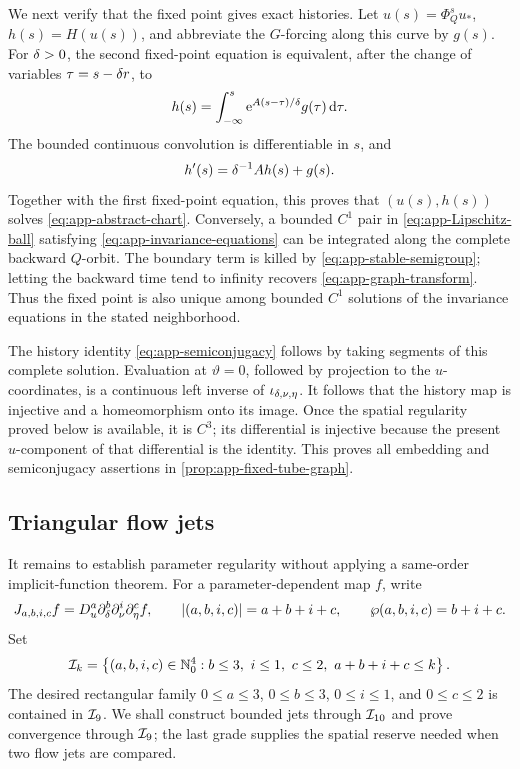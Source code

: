 We next verify that the fixed point gives exact histories.  Let
\(u(s)=\Phi_Q^s u_*\), \(h(s)=H(u(s))\), and abbreviate the \(G\)-forcing
along this curve by \(g(s)\).  For \(\delta>0\), the second fixed-point
equation is equivalent, after the change of variables
\(\tau=s-\delta r\), to
\begin{equation}
\label{eq:app-stable-convolution}
 h(s)=\int_{-\infty}^s
       \mathrm e^{A(s-\tau)/\delta}g(\tau)\,\mathrm d\tau.
\end{equation}
The bounded continuous convolution is differentiable in \(s\), and
\[
 h'(s)=\delta^{-1}Ah(s)+g(s).
\]
Together with the first fixed-point equation, this proves that
\((u(s),h(s))\) solves \cref{eq:app-abstract-chart}.  Conversely, a bounded
\(C^1\) pair in \cref{eq:app-Lipschitz-ball} satisfying
\cref{eq:app-invariance-equations} can be integrated along the complete
backward \(Q\)-orbit.  The boundary term is killed by
\cref{eq:app-stable-semigroup}; letting the backward time tend to infinity
recovers \cref{eq:app-graph-transform}.  Thus the fixed point is also unique
among bounded \(C^1\) solutions of the invariance equations in the stated
neighborhood.

The history identity \cref{eq:app-semiconjugacy} follows by taking segments
of this complete solution.  Evaluation at \(\vartheta=0\), followed by
projection to the \(u\)-coordinates, is a continuous left inverse of
\(\iota_{\delta,\nu,\eta}\).  It follows that the history map is injective and
a homeomorphism onto its image.  Once the spatial regularity proved below
is available, it is \(C^3\); its differential is injective because the
present \(u\)-component of that differential is the identity.  This proves
all embedding and semiconjugacy assertions in
\cref{prop:app-fixed-tube-graph}.

\subsection{Triangular flow jets}
\label{app:compact-flow-jets}
\label{app:mixed-jets}

It remains to establish parameter regularity without applying a same-order
implicit-function theorem.  For a parameter-dependent map \(f\), write
\begin{equation}
\label{eq:app-jet-notation}
 J_{a,b,i,c}f=D_u^a\partial_\delta^b\partial_\nu^i\partial_\eta^c f,
 \qquad
 |(a,b,i,c)|=a+b+i+c,
 \qquad
 \wp(a,b,i,c)=b+i+c.
\end{equation}
Set
\begin{equation}
\label{eq:app-triangular-index-set}
 \mathcal I_k=
 \left\{(a,b,i,c)\in\mathbb N_0^4:
 b\leq3,\ i\leq1,\ c\leq2,\ a+b+i+c\leq k\right\}.
\end{equation}
The desired rectangular family
\(0\leq a\leq3\), \(0\leq b\leq3\), \(0\leq i\leq1\), and
\(0\leq c\leq2\) is contained in
\(\mathcal I_9\).  We shall construct bounded jets through \(\mathcal I_{10}\) and prove
convergence through \(\mathcal I_9\); the last grade supplies the spatial reserve
needed when two flow jets are compared.

